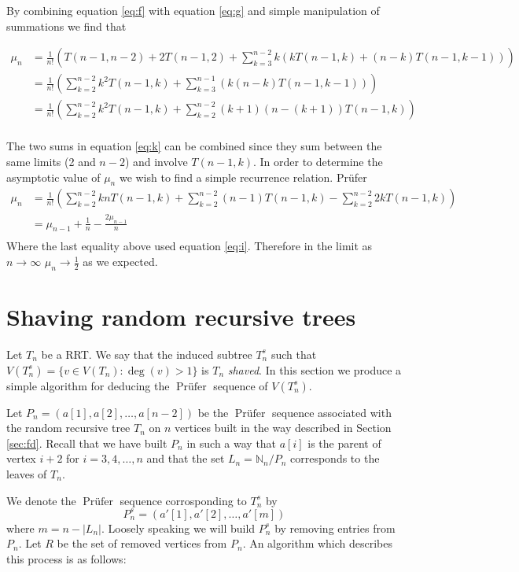 \documentclass[10pt]{article} %
\theoremstyle{definition}
\DeclareMathOperator{\p}{\text{Pr\"{u}fer}}
\begin{document}
By combining equation \ref{eq:f} with equation \ref{eq:g} and simple manipulation of summations we find that

\begin{align}\label{eq:k}
 \mu_{n} &= \frac{1}{n!}\left( T(n-1,n-2) + 2T(n-1,2) + \sum_{k=3}^{n-2}k\left( kT(n-1,k) + (n-k)T(n-1,k-1)\right)\right) \\
 &= \frac{1}{n!}\left( \sum_{k=2}^{n-2}k^{2}T(n-1,k) + \sum_{k=3}^{n-1}\left(k(n-k)T(n-1,k-1)\right)\right) \\
 &= \frac{1}{n!}\left( \sum_{k=2}^{n-2}k^{2}T(n-1,k) + \sum_{k=2}^{n-2}(k+1)(n-(k + 1))T(n-1,k)\right) \\
 \end{align}

The two sums in equation \ref{eq:k} can be combined since they sum between the same limits (2 and $n-2$) and involve $T(n-1,k)$.  In order to determine the asymptotic value of $\mu_{n}$ we wish to find a simple recurrence relation.  
 Pr\"{u}fer
\begin{align*}\label{eq:j}
 \mu_{n} &= \frac{1}{n!}\left( \sum_{k=2}^{n-2}knT(n-1,k) + \sum_{k=2}^{n-2}(n-1)T(n-1,k) - \sum_{k=2}^{n-2}2kT(n-1,k) \right) \\
  &=  \mu_{n-1} + \frac{1}{n} -  \frac{2\mu_{n-1}}{n}  \\
\end{align*}
Where the last equality above used equation \ref{eq:i}.  Therefore in the limit as $n \rightarrow \infty$ $\mu_{n} \rightarrow \frac{1}{2}$ as we expected.   

\section{Shaving random recursive trees}

Let $T_n$ be a RRT. We say that the induced subtree $T^s_n$ such that $V(T^s_n) = \{ v \in V(T_n) : \deg(v) > 1 \}$ is $T_n$ \emph{shaved}. In this section we produce a simple algorithm for deducing the $\p$ sequence of  $V(T^s_n)$. 

Let $P_n = (a[1],a[2],\dots,a[n-2])$ be the $\p$ sequence associated with the random recursive tree $T_n$ on $n$ vertices built in the way described in Section \ref{sec:fd}.  Recall that we have built $P_n$ in such a way that $a[i]$ is the parent of vertex $i + 2$ for $i = 3,4,\dots,n$ and that the set $L_n = \mathbb{N}_n / P_n$ corresponds to the leaves of $T_n$.

We denote the $\p$ sequence corrosponding to $T^s_n$ by 
\[P_n^s = (a'[1],a'[2],\dots,a'[m])\]
where $m = n - |L_n|$.  Loosely speaking we will build $ P_n^s$ by removing entries from $P_n$. Let $R$  be the set of removed vertices from $P_n$. An algorithm which describes this process is as follows:   
\end{document}
